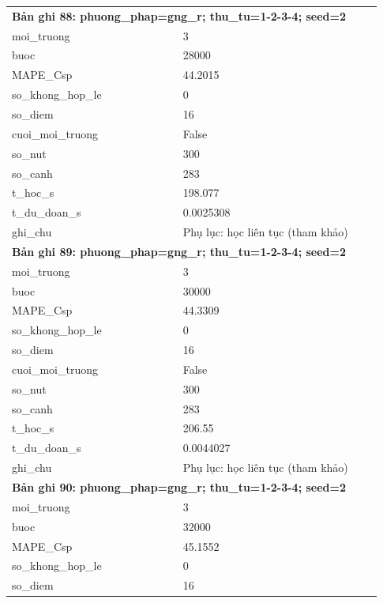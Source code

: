 \begin{longtable}{p{0.43\linewidth}p{0.50\linewidth}}
\midrule
\multicolumn{2}{p{0.95\linewidth}}{\textbf{Bản ghi 88: phuong\_phap=gng\_r; thu\_tu=1-2-3-4; seed=2}} \\
moi\_\allowbreak truong & 3 \\
buoc & 28000 \\
MAPE\_\allowbreak Csp & 44.2015 \\
so\_\allowbreak khong\_\allowbreak hop\_\allowbreak le & 0 \\
so\_\allowbreak diem & 16 \\
cuoi\_\allowbreak moi\_\allowbreak truong & False \\
so\_\allowbreak nut & 300 \\
so\_\allowbreak canh & 283 \\
t\_\allowbreak hoc\_\allowbreak s & 198.077 \\
t\_\allowbreak du\_\allowbreak doan\_\allowbreak s & 0.0025308 \\
ghi\_\allowbreak chu & Phụ lục: học liên tục (tham khảo) \\
\midrule
\multicolumn{2}{p{0.95\linewidth}}{\textbf{Bản ghi 89: phuong\_phap=gng\_r; thu\_tu=1-2-3-4; seed=2}} \\
moi\_\allowbreak truong & 3 \\
buoc & 30000 \\
MAPE\_\allowbreak Csp & 44.3309 \\
so\_\allowbreak khong\_\allowbreak hop\_\allowbreak le & 0 \\
so\_\allowbreak diem & 16 \\
cuoi\_\allowbreak moi\_\allowbreak truong & False \\
so\_\allowbreak nut & 300 \\
so\_\allowbreak canh & 283 \\
t\_\allowbreak hoc\_\allowbreak s & 206.55 \\
t\_\allowbreak du\_\allowbreak doan\_\allowbreak s & 0.0044027 \\
ghi\_\allowbreak chu & Phụ lục: học liên tục (tham khảo) \\
\midrule
\multicolumn{2}{p{0.95\linewidth}}{\textbf{Bản ghi 90: phuong\_phap=gng\_r; thu\_tu=1-2-3-4; seed=2}} \\
moi\_\allowbreak truong & 3 \\
buoc & 32000 \\
MAPE\_\allowbreak Csp & 45.1552 \\
so\_\allowbreak khong\_\allowbreak hop\_\allowbreak le & 0 \\
so\_\allowbreak diem & 16 \\

\end{longtable}
